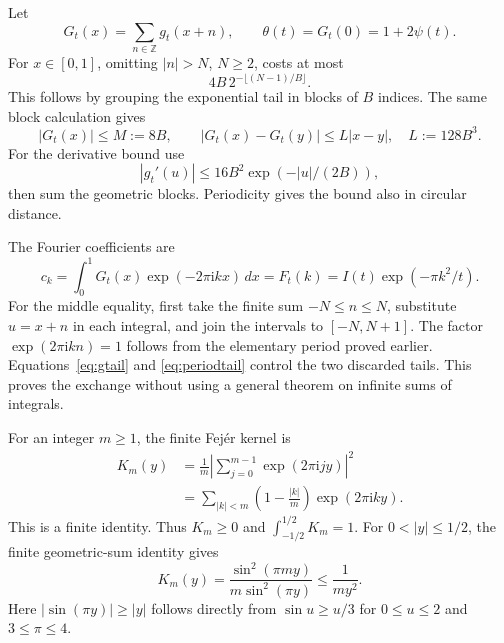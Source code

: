 \documentclass[11pt,letterpaper]{article}
\numberwithin{equation}{section}
\theoremstyle{definition}
\newcommand{\Z}{\mathbb Z}
\newcommand{\ii}{\mathrm i}
\newcommand{\ps}{\psi}
\begin{document}
Let
\[
          G_t(x)=\sum_{n\in\Z}g_t(x+n),\qquad
          \theta(t)=G_t(0)=1+2\ps(t).
\]
For \(x\in[0,1]\), omitting \(|n|>N\), \(N\ge2\), costs at most
\begin{equation}
                4B\,2^{-\lfloor(N-1)/B\rfloor}.             \label{eq:periodtail}
\end{equation}
This follows by grouping the exponential tail in blocks of \(B\)
indices. The same block calculation gives
\begin{equation}
 |G_t(x)|\le M:=8B,\qquad
 |G_t(x)-G_t(y)|\le L|x-y|,\quad L:=128B^3.                \label{eq:periodbounds}
\end{equation}
For the derivative bound use
\[
 |g_t'(u)|\le16B^2\exp(-|u|/(2B)),
\]
then sum the geometric blocks. Periodicity gives the bound also
in circular distance.

The Fourier coefficients are
\begin{equation}
 c_k=\int_0^1G_t(x)\exp(-2\pi\ii kx)\,dx
       =F_t(k)=I(t)\exp(-\pi k^2/t).                       \label{eq:coeffs}
\end{equation}
For the middle equality, first take the finite sum
\(-N\le n\le N\), substitute \(u=x+n\) in each integral,
and join the intervals to \([-N,N+1]\). The factor
\(\exp(2\pi\ii kn)=1\) follows from the elementary period proved
earlier. Equations~\eqref{eq:gtail} and \eqref{eq:periodtail}
control the two discarded tails. This proves the exchange without
using a general theorem on infinite sums of integrals.

For an integer \(m\ge1\), the finite Fej\'er kernel is
\begin{align}
 K_m(y)&=\frac1m\left|\sum_{j=0}^{m-1}\exp(2\pi\ii jy)\right|^2\\
 &=\sum_{|k|<m}\left(1-\frac{|k|}{m}\right)
                         \exp(2\pi\ii ky).
 \label{eq:Fejer}
\end{align}
This is a finite identity. Thus \(K_m\ge0\) and
\(\int_{-1/2}^{1/2}K_m=1\). For \(0<|y|\le1/2\), the finite
geometric-sum identity gives
\begin{equation}
 K_m(y)=\frac{\sin^2(\pi my)}{m\sin^2(\pi y)}
                \le\frac1{my^2}.                         \label{eq:Fejerbound}
\end{equation}
Here \(|\sin(\pi y)|\ge |y|\) follows directly from
\(\sin u\ge u/3\) for \(0\le u\le2\) and \(3\le\pi\le4\).
\end{document}
